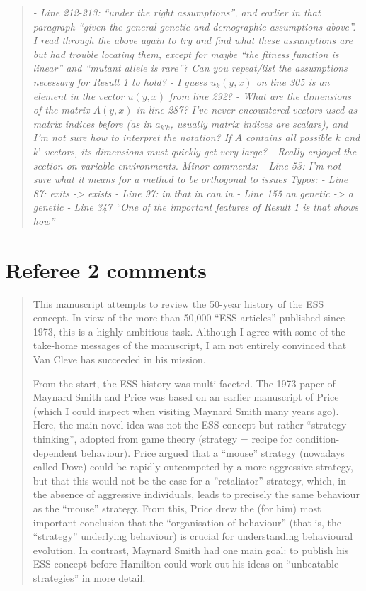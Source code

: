 \documentclass[10pt,parskip=full,foldmarks=off,addrfield=off,backaddress=false,refline=dateleft,letterpaper]{scrlttr2}
\newenvironment{reviewerquote}{\begin{quote}\color{DarkBlue}\itshape}{\end{quote}}
\begin{document}
\begin{letter}
\begin{reviewerquote}
- Line 212-213: “under the right assumptions”, and earlier in that paragraph “given the general genetic and demographic assumptions above”. I read through the above again to try and find what these assumptions are but had trouble locating them, except for maybe “the fitness function is linear” and “mutant allele is rare”? Can you repeat/list the assumptions necessary for Result 1 to hold?
- I guess $u_k(y,x)$ on line 305 is an element in the vector $u(y,x)$ from line 292?
- What are the dimensions of the matrix $A(y,x)$ in line 287? I’ve never encountered vectors used as matrix indices before (as in $a_{k’k}$, usually matrix indices are scalars), and I’m not sure how to interpret the notation? If $A$ contains all possible $k$ and $k’$ vectors, its dimensions must quickly get very large?
- Really enjoyed the section on variable environments.
Minor comments:
- Line 53: I’m not sure what it means for a method to be orthogonal to issues
Typos:
- Line 87: exits -> exists
- Line 97: in that in can in
- Line 155 an genetic -> a genetic
- Line 347 “One of the important features of Result 1 is that shows how”
\end{reviewerquote}

\section{Referee 2 comments}

\begin{reviewerquote}

This manuscript attempts to review the 50-year history of the ESS concept. In view of the more than 50,000 “ESS articles” published since 1973, this is a highly ambitious task. Although I agree with some of the take-home messages of the manuscript, I am not entirely convinced that Van Cleve has succeeded in his mission.

From the start, the ESS history was multi-faceted. The 1973 paper of Maynard Smith and Price was based on an earlier manuscript of Price (which I could inspect when visiting Maynard Smith many years ago). Here, the main novel idea was not the ESS concept but rather “strategy thinking”, adopted from game theory (strategy = recipe for condition-dependent behaviour). Price argued that a “mouse” strategy (nowadays called Dove) could be rapidly outcompeted by a more aggressive strategy, but that this would not be the case for a ”retaliator” strategy, which, in the absence of aggressive individuals, leads to precisely the same behaviour as the “mouse” strategy. From this, Price drew the (for him) most important conclusion that the “organisation of behaviour” (that is, the “strategy” underlying behaviour) is crucial for understanding behavioural evolution. In contrast, Maynard Smith had one main goal: to publish his ESS concept before Hamilton could work out his ideas on “unbeatable strategies” in more detail.


\end{reviewerquote}
\end{letter}
\end{document}

